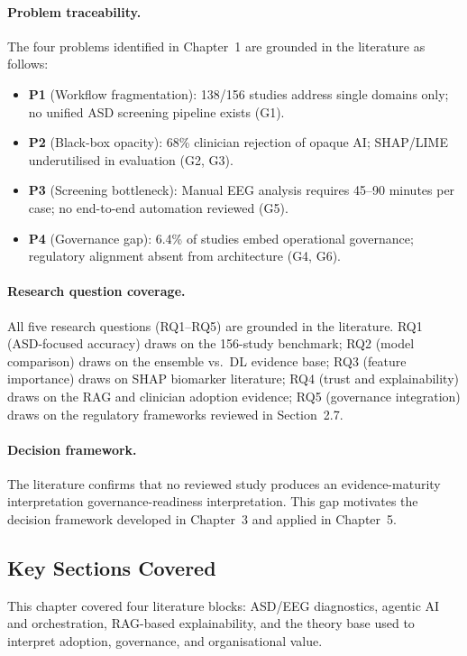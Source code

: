 \paragraph{Problem traceability.}
The four problems identified in Chapter~1 are grounded in the literature as follows:
\begin{itemize}[leftmargin=*, itemsep=2pt]
\item \textbf{P1} (Workflow fragmentation): 138/156 studies address single domains only; no unified ASD screening pipeline exists (G1).
\item \textbf{P2} (Black-box opacity): 68\% clinician rejection of opaque AI; SHAP/LIME underutilised in evaluation (G2, G3).
\item \textbf{P3} (Screening bottleneck): Manual EEG analysis requires 45--90 minutes per case; no end-to-end automation reviewed (G5).
\item \textbf{P4} (Governance gap): 6.4\% of studies embed operational governance; regulatory alignment absent from architecture (G4, G6).
\end{itemize}

\paragraph{Research question coverage.}
All five research questions (RQ1--RQ5) are grounded in the literature. RQ1 (ASD-focused accuracy) draws on the 156-study benchmark; RQ2 (model comparison) draws on the ensemble vs.\ DL evidence base; RQ3 (feature importance) draws on SHAP biomarker literature; RQ4 (trust and explainability) draws on the RAG and clinician adoption evidence; RQ5 (governance integration) draws on the regulatory frameworks reviewed in Section~2.7.

\paragraph{Decision framework.}
The literature confirms that no reviewed study produces an evidence-maturity interpretation governance-readiness interpretation. This gap motivates the decision framework developed in Chapter~3 and applied in Chapter~5.

\subsection{Key Sections Covered}

\noindent This chapter covered four literature blocks: ASD/EEG diagnostics, agentic AI and orchestration, RAG-based explainability, and the theory base used to interpret adoption, governance, and organisational value.


